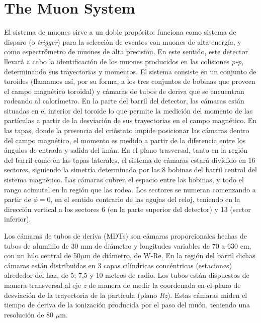 \section{The Muon System}\label{sec:atlasCALO}
 El sistema de muones sirve a un doble prop\'osito: funciona como sistema de disparo (o \emph{trigger}) para la selecci\'on de eventos con muones de alta energ\'ia, y como espectr\'ometro de muones de alta precisi\'on. En este sentido, este detector llevar\'a a cabo la identificaci\'on de los muones producidos en las colisiones \emph{p-p}, determinando sus trayectorias y momentos.
   El sistema consiste en un conjunto de toroides (llamamos as\'i, por su forma, a los tres conjuntos de bobinas que proveen el campo magn\'etico toroidal) y c\'amaras de tubos de deriva que se encuentran rodeando al calor\'imetro. En la parte del barril del detector, las c\'amaras est\'an situadas en el interior del toroide lo que permite la medici\'on del momento de las part\'iculas a partir de la desviaci\'on de sus trayectorias en el campo magn\'etico. En las tapas, donde la presencia del cri\'ostato impide posicionar las c\'amaras dentro del campo magn\'etico, el momento es medido a partir de la diferencia entre los \'angulos de entrada y salida del im\'an.
En el plano trasversal, tanto en la regi\'on del barril como en las tapas laterales, el sistema de c\'amaras estar\'a dividido en 16 sectores, siguiendo la simetr\'ia determinada por las 8 bobinas del barril central del sistema magn\'etico. Las c\'amaras cubren el espacio entre las bobinas, y todo el rango acimutal en la regi\'on que las rodea. Los sectores se numeran comenzando a partir de $\phi = 0$, en el sentido contrario de las agujas del reloj, teniendo en la direcci\'on vertical a los sectores 6 (en la parte superior del detector) y 13 (sector inferior).  

   Los c\'amaras de tubos de deriva (MDTs) son c\'amaras proporcionales hechas de tubos de aluminio de 30 mm de di\'ametro y longitudes variables de 70 a 630 cm, con un hilo central de 50$\mu$m de di\'ametro, de W-Re. En la regi\'on del barril dichas c\'amaras est\'an distribuidas en 3 capas cil\'indricas conc\'entricas (estaciones) alrededor del haz, de 5; 7,5 y 10 metros de radio. Los tubos est\'an dispuestos de manera transversal al eje \emph{z} de manera de medir la coordenada en el plano de desviaci\'on de la trayectoria de la part\'icula (plano \emph{Rz}).  Estas c\'amaras miden el tiempo de deriva de la ionizaci\'on producida por el paso del mu\'on, teniendo una resoluci\'on de 80 $\mu$m.
   
